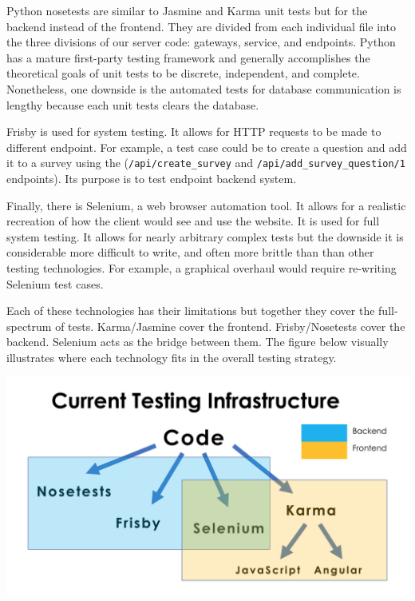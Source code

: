 \documentclass[12pt]{report}
\begin{document}
\par\noindent
Python nosetests are similar to Jasmine and Karma unit tests but for the backend instead of the frontend. They are divided from each individual file into the three divisions of our server code: gateways, service, and endpoints. Python has a mature first-party testing framework and generally accomplishes the theoretical goals of unit tests to be discrete, independent, and complete. Nonetheless, one downside is the automated tests for database communication is lengthy because each unit tests clears the database.

\par\noindent
Frisby is used for system testing. It allows for HTTP requests to be made to different endpoint. For example, a test case could be to create a question and add it to a survey using the (\texttt{/api/create\_survey} and \texttt{/api/add\_survey\_question/1} endpoints). Its purpose is to test endpoint backend system.

\par\noindent
Finally, there is Selenium, a web browser automation tool. It allows for a realistic recreation of how the client would see and use the website. It is used for full system testing. It allows for nearly arbitrary complex tests but the downside it is considerable more difficult to write, and often more brittle than than other testing technologies. For example, a graphical overhaul would require re-writing Selenium test cases.

\par\noindent
Each of these technologies has their limitations but together they cover the full-spectrum of tests. Karma/Jasmine cover the frontend. Frisby/Nosetests cover the backend. Selenium acts as the bridge between them. The figure below visually illustrates where each technology fits in the overall testing strategy.

\begin{center}
\includegraphics[scale=0.3]{infra}
\end{center}
\end{document}
